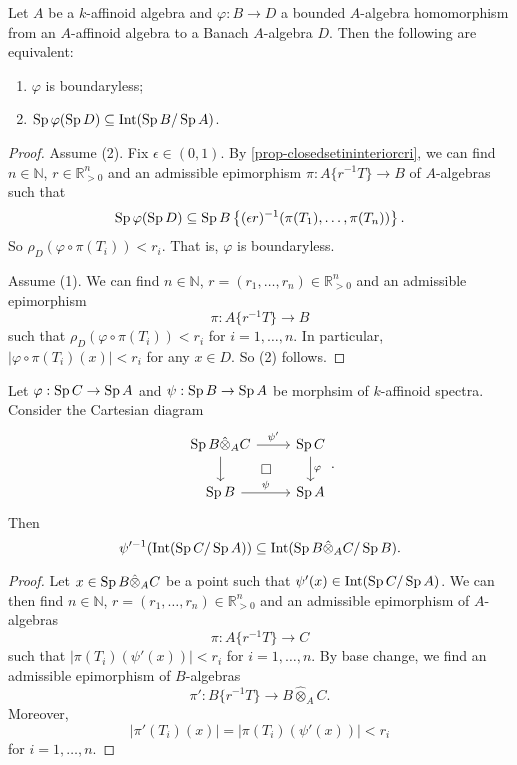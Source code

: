 \begin{proposition}
    Let $A$ be a $k$-affinoid algebra and $\varphi:B\rightarrow D$ a bounded $A$-algebra homomorphism from an $A$-affinoid algebra to a Banach $A$-algebra $D$. Then the following are equivalent:
    \begin{enumerate}
        \item $\varphi$ is boundaryless;
        \item $\operatorname{Sp} \varphi(\operatorname{Sp} D)\subseteq \operatorname{Int}(\operatorname{Sp} B/\operatorname{Sp} A)$.
    \end{enumerate}
\end{proposition}
\begin{proof}
    Assume (2). Fix $\epsilon\in (0,1)$. By \cref{prop-closedsetininteriorcri}, we can find $n\in \mathbb{N}$, $r\in \mathbb{R}^n_{>0}$ and an admissible epimorphism $\pi: A\{r^{-1}T\}\rightarrow B$ of $A$-algebras such that 
    \[
        \operatorname{Sp} \varphi(\operatorname{Sp} D)\subseteq \operatorname{Sp} B\left\{(\epsilon r)^{-1}(\pi(T_1),\ldots,\pi(T_n))\right\}.    
    \]
    So $\rho_D(\varphi\circ \pi(T_i))<r_i$. That is, $\varphi$ is boundaryless.

    Assume (1). We can find $n\in \mathbb{N}$, $r=(r_1,\ldots,r_n)\in \mathbb{R}^n_{>0}$ and an admissible epimorphism
    \[
        \pi: A\{r^{-1}T\}\rightarrow B    
    \] 
    such that $\rho_D(\varphi\circ \pi(T_i))<r_i$ for $i=1,\ldots,n$. In particular, $|\varphi\circ\pi(T_i)(x)|<r_i$ for any $x\in D$. So (2) follows. 
\end{proof}

\begin{proposition}\label{prop-interiorbasechange}
    Let $\varphi:\operatorname{Sp} C\rightarrow \operatorname{Sp} A$ and $\psi:\operatorname{Sp} B\rightarrow \operatorname{Sp} A$ be morphsim of $k$-affinoid spectra. Consider the Cartesian diagram
    \[
        \begin{tikzcd}
            \Sp B\hat{\otimes}_A C \arrow[r, "\psi'"] \arrow[d] \arrow[rd, "\square", phantom] & \Sp C \arrow[d, "\varphi"] \\
            \Sp B \arrow[r, "\psi"]                                                            & \Sp A                     
        \end{tikzcd}.  
    \]
    Then
    \[
        \psi'^{-1}(\operatorname{Int}(\operatorname{Sp} C/\operatorname{Sp} A))\subseteq \operatorname{Int}(\operatorname{Sp} B\hat{\otimes}_A C/\operatorname{Sp} B).  
    \]
\end{proposition}
\begin{proof}
    Let $x\in \operatorname{Sp} B\hat{\otimes}_A C$ be a point such that $\psi'(x)\in \operatorname{Int}(\operatorname{Sp} C/\operatorname{Sp} A)$. We can then find $n\in \mathbb{N}$, $r=(r_1,\ldots,r_n)\in \mathbb{R}^n_{>0}$ and an admissible epimorphism of $A$-algebras
    \[
        \pi: A\{r^{-1}T\}\rightarrow C    
    \] 
    such that $|\pi(T_i)(\psi'(x))|<r_i$ for $i=1,\ldots,n$. By base change, we find an admissible epimorphism of $B$-algebras
    \[
        \pi':   B\{r^{-1}T\}\rightarrow B\hat{\otimes}_A C.   
    \]
    Moreover,
    \[
        |\pi'(T_i)(x)|=|\pi(T_i)(\psi'(x))|<r_i
    \]
    for $i=1,\ldots,n$.
\end{proof}

